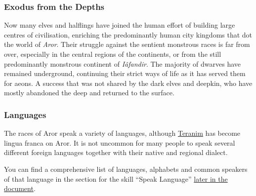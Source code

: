 \subsubsection{Exodus from the Depths}
\label{sec:Exodus from the Depths}

Now many elves and halflings have joined the human effort of building large
centres of civilisation, enriching the predominantly human city kingdoms that
dot the world of \emph{Aror}. Their struggle against the sentient monstrous
races is far from over, especially in the central regions of the continents,
or from the still predominantly monstrous continent of \emph{Iâfandir}. The
majority of dwarves have remained underground, continuing their strict ways of
life as it has served them for aeons. A success that was not shared by the
dark elves and deepkin, who have mostly abandoned the deep and returned to the
surface.

\subsubsection{Languages}
\label{sec:Languages}

The races of Aror speak a variety of languages, although \hyperref[sec:Speak
Language]{Teranim} has become lingua franca on Aror. It is not uncommon for
many people to speak several different foreign languages together with their
native and regional dialect.

\begin{note}
  You can find a comprehensive list of languages, alphabets and common speakers
  of that language in the section for the skill ``Speak
  Language'' \hyperref[sec:Speak Language]{later in the document}.
\end{note}

















